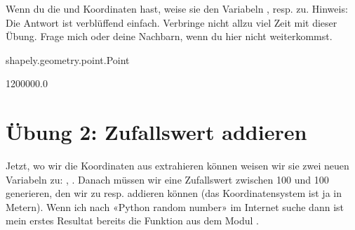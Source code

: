 \documentclass[letterpaper,10pt,english]{sphinxmanual}
\begin{document}
Wenn du die  und  Koordinaten hast, weise sie den Variabeln , resp.  zu.
Hinweis: Die Antwort ist verblüffend einfach. Verbringe nicht allzu viel Zeit mit dieser Übung. Frage mich oder deine Nachbarn, wenn du hier nicht weiterkommst.

\begin{sphinxVerbatim}[commandchars=\\\{\}]
\end{sphinxVerbatim}

\begin{sphinxVerbatim}[commandchars=\\\{\}]
shapely.geometry.point.Point
\end{sphinxVerbatim}

\begin{sphinxVerbatim}[commandchars=\\\{\}]
\end{sphinxVerbatim}

\begin{sphinxVerbatim}[commandchars=\\\{\}]

\end{sphinxVerbatim}

\begin{sphinxVerbatim}[commandchars=\\\{\}]
1200000.0
\end{sphinxVerbatim}


\section{Übung 2: Zufallswert addieren}
\label{\detokenize{02_04_Einzelpunkt_Verschieben:ubung-2-zufallswert-addieren}}
Jetzt, wo wir die Koordinaten aus extrahieren können weisen wir sie zwei neuen Variabeln zu: , . Danach müssen wir eine Zufallswert zwischen \sphinxhyphen{}100 und 100 generieren, den wir zu  resp.  addieren können (das Koordinatensystem ist ja in Metern).  Wenn ich nach «Python random number» im Internet suche dann ist mein erstes Resultat bereits die Funktion  aus dem Modul .
\end{document}
